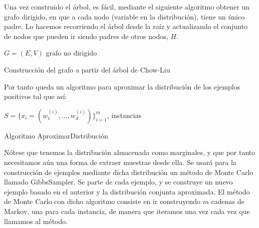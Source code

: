 Una vez construido el árbol, es fácil, mediante el siguiente algoritmo obtener un grafo dirigido, en que a
cada nodo (variable en la distribución), tiene un único padre. Lo hacemos recorriendo el árbol desde la raíz
y actualizando el conjunto de nodos que pueden ir siendo padres de otros nodos, $H$.

\begin{algorithm}[H]
\begin{algorithmic}[1]
 \REQUIRE $G = (E,V)$ grafo no dirigido
 \ENDWHILE
 \NEWLINE
\end{algorithmic}
\caption{Construcción del grafo a partir del árbol de Chow-Liu}
\label{alg:make-directed}
\end{algorithm}

Por tanto queda un algoritmo para aproximar la distribución de los ejemplos positivos tal que así:

\begin{algorithm}[H]
\begin{algorithmic}[1]
  \REQUIRE $S = \{x_i=(w_1^{(i)}, \ldots, w_d^{(i)})\}_{i=1}^m$, instancias
  \ENDFOR
\end{algorithmic}
\caption{Algoritmo AproximarDistribución}
\label{alg:aproxdist}
\end{algorithm}

Nótese que tenemos la distribución almacenada como marginales, y que por tanto necesitamos aún una forma de extraer
muestras desde ella. Se usará para la construcción de ejemplos mediante dicha distribución un método de Monte 
Carlo llamado GibbsSampler. Se parte de cada ejemplo, y se construye un nuevo ejemplo basado en el anterior y 
la distribución conjunta aproximada. El método de Monte Carlo con dicho algoritmo consiste en ir construyendo 
$m$ cadenas de Markov, una para cada instancia, de manera que iteramos una vez cada vez que llamamos al método.


